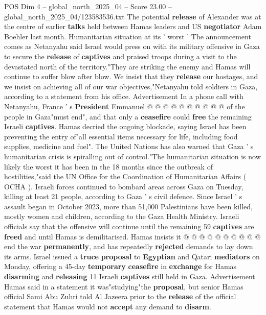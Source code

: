 \begin{textsample}{POS Dim 4 – global\_north\_2025\_04 – Score 23.00 – global\_north\_2025\_04/123583536.txt}
The potential \textbf{release} of Alexander was at the centre of earlier \textbf{talks} held between Hamas leaders and US \textbf{negotiator} Adam Boehler last month.
Humanitarian situation at its ' worst ' The announcement comes as Netanyahu said Israel would press on with its military offensive in Gaza to secure the \textbf{release} of \textbf{captives} and praised troops during a visit to the devastated north of the territory."They are striking the enemy and Hamas will continue to suffer blow after blow.
We insist that they \textbf{release} our hostages, and we insist on achieving all of our war objectives,"Netanyahu told soldiers in Gaza, according to a statement from his office.
Advertisement In a phone call with Netanyahu, France ' s \textbf{President} Emmanuel @ @ @ @ @ @ @ @ @ @ of the people in Gaza"must end", and that only a \textbf{ceasefire} could \textbf{free} the remaining Israeli \textbf{captives}.
Hamas decried the ongoing blockade, saying Israel has been preventing the entry of"all essential items necessary for life, including food supplies, medicine and fuel".
The United Nations has also warned that Gaza ' s humanitarian crisis is spiralling out of control."The humanitarian situation is now likely the worst it has been in the 18 months since the outbreak of hostilities,"said the UN Office for the Coordination of Humanitarian Affairs ( OCHA ).
Israeli forces continued to bombard areas across Gaza on Tuesday, killing at least 21 people, according to Gaza ' s civil defence.
Since Israel ' s assault began in October 2023, more than 51,000 Palestinians have been killed, mostly women and children, according to the Gaza Health Ministry.
Israeli officials say that the offensive will continue until the remaining 59 \textbf{captives} are \textbf{freed} and until Hamas is demilitarised.
Hamas insists it @ @ @ @ @ @ @ @ @ @ end the war \textbf{permanently}, and has repeatedly \textbf{rejected} demands to lay down its arms.
Israel issued a \textbf{truce} \textbf{proposal} to \textbf{Egyptian} and Qatari \textbf{mediators} on Monday, offering a 45-day \textbf{temporary} \textbf{ceasefire} in \textbf{exchange} for Hamas \textbf{disarming} and \textbf{releasing} 11 Israeli \textbf{captives} still held in Gaza.
Advertisement Hamas said in a statement it was"studying"the \textbf{proposal}, but senior Hamas official Sami Abu Zuhri told Al Jazeera prior to the \textbf{release} of the official statement that Hamas would not \textbf{accept} any demand to \textbf{disarm}.

\end{textsample}
